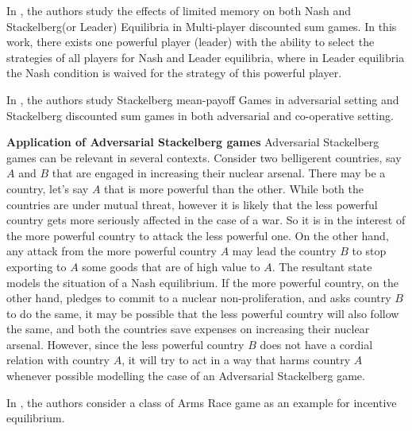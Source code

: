 In \cite{GS15}, the authors study the effects of limited memory on both Nash and Stackelberg(or Leader) Equilibria in Multi-player discounted sum games. In this work, there exists one powerful player (leader) with the ability to select the strategies of all players for Nash and Leader equilibria, where in Leader equilibria the Nash condition is waived for the strategy of this powerful player.

In \cite{FGR20}, the authors study Stackelberg mean-payoff Games in adversarial setting and  Stackelberg discounted sum games in both adversarial and co-operative setting.

\textbf{Application of Adversarial Stackelberg games} Adversarial Stackelberg games can be relevant in several contexts. Consider two belligerent countries, say $A$ and $B$ that are engaged in increasing their nuclear arsenal. There may be a country, let's say $A$ that is more powerful than the other. While both the countries are under mutual threat, however it is likely that the less powerful country gets more seriously affected in the case of a war. So it is in the interest of the more powerful country to attack the less powerful one. On the other hand, any attack from the more powerful country $A$ may lead the country $B$ to stop exporting to $A$ some goods that are of high value to $A$. The resultant state models the situation of a Nash equilibrium. If the more powerful country, on the other hand, pledges to commit to a nuclear non-proliferation, and asks country $B$ to do the same, it may be possible that the less powerful country will also follow the same, and both the countries save expenses on increasing their nuclear arsenal. However, since the less powerful country $B$ does not have a cordial relation with country $A$, it will try to act in a way that harms  country $A$ whenever possible modelling the case of an Adversarial Stackelberg game.

In \cite{GS18}, the authors consider a class of Arms Race game as an example for incentive equilibrium.


